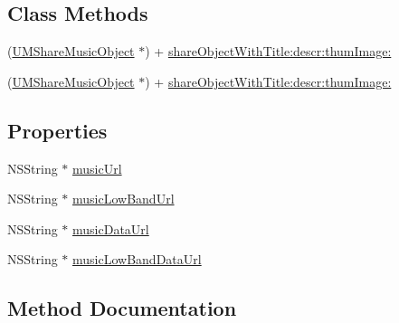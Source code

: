 \subsection*{Class Methods}
\begin{DoxyCompactItemize}
\item 
(\mbox{\hyperlink{interface_u_m_share_music_object}{U\+M\+Share\+Music\+Object}} $\ast$) + \mbox{\hyperlink{interface_u_m_share_music_object_a6288b329e1b6205247919551c127c55d}{share\+Object\+With\+Title\+:descr\+:thum\+Image\+:}}
\item 
(\mbox{\hyperlink{interface_u_m_share_music_object}{U\+M\+Share\+Music\+Object}} $\ast$) + \mbox{\hyperlink{interface_u_m_share_music_object_a6288b329e1b6205247919551c127c55d}{share\+Object\+With\+Title\+:descr\+:thum\+Image\+:}}
\end{DoxyCompactItemize}
\subsection*{Properties}
\begin{DoxyCompactItemize}
\item 
N\+S\+String $\ast$ \mbox{\hyperlink{interface_u_m_share_music_object_adcef82e04caa8ff74b854e4df7f0d800}{music\+Url}}
\item 
N\+S\+String $\ast$ \mbox{\hyperlink{interface_u_m_share_music_object_a88baa03406b2bbaa12cfbf0389e37245}{music\+Low\+Band\+Url}}
\item 
N\+S\+String $\ast$ \mbox{\hyperlink{interface_u_m_share_music_object_a932f39119d8d580681f561ea1bfcce9c}{music\+Data\+Url}}
\item 
N\+S\+String $\ast$ \mbox{\hyperlink{interface_u_m_share_music_object_a61ddf425d8d83d398a30b451875221bb}{music\+Low\+Band\+Data\+Url}}
\end{DoxyCompactItemize}


\subsection{Method Documentation}
\mbox{\label{interface_u_m_share_music_object_a6288b329e1b6205247919551c127c55d}} 
